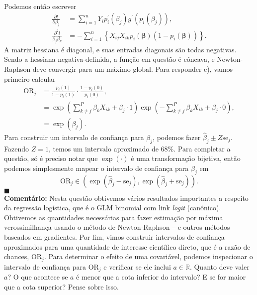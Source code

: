 {\begin{align*}
\end{align*}
Podemos então escrever
\begin{align*}
 \frac{\partial l }{\partial \beta_j} &= \sum_{i=1}^n Y_i  p_i^{\prime}(\beta_j)g^\prime(p_i(\beta_j)),\\
 \frac{\partial^2 l}{\beta_j\beta_k} &= -\sum_{i=1}^n \left\{X_{ij}X_{ik} p_i(\boldsymbol{\beta})\left(1-p_i(\boldsymbol{\beta})\right)\right\}.
\end{align*}
A matriz hessiana é diagonal, e suas entradas diagonais são todas negativas.
Sendo a hessiana negativa-definida, a função em questão é côncava, e Newton-Raphson deve convergir para um máximo global.
Para responder c), vamos primeiro calcular 
\begin{align*}
    \textrm{OR}_j &= \frac{p_i(1)}{1-p_i(1)} \cdot \frac{1-p_i(0)}{p_i(0)},\\
    &= \exp\left(\sum_{k\neq j}^{P} \beta_k X_{ik} + \beta_j \cdot 1\right)\exp\left(-\sum_{k\neq j}^{P} \beta_k X_{ik} + \beta_j \cdot 0\right),\\
    & = \exp\left(\beta_j\right).
\end{align*}
Para construir um intervalo de confiança para $\beta_j$, podemos fazer $\hat{\beta}_j \pm Z \textrm{se}_j$.
Fazendo $Z=1$, temos um intervalo aproximado de 68\%.
Para completar a questão, só é preciso notar que $\exp(\cdot)$ é uma transformação bijetiva, então podemos simplesmente mapear o intervalo de confiança para $\beta_j$ em
\begin{equation}
    \textrm{OR}_j \in \left(\exp\left(\hat{\beta}_j  - \textrm{se}_j \right), \exp\left(\hat{\beta}_j + \textrm{se}_j\right)\right).
\end{equation}
$\blacksquare$\\
\textbf{Comentário:} Nesta questão obtivemos vários resultados importantes a respeito da regressão logística, que é o GLM binomial com link \textit{logit} (canônico).
Obtivemos as quantidades necessárias para fazer estimação por máxima verossimilhança usando o método de Newton-Raphson -- e outros métodos baseados em gradientes. 
Por fim, vimos construir intervalos de confiança aproximados para uma quantidade de interesse científico direto, que é a razão de chances, $ \textrm{OR}_j $.
Para determinar o efeito de uma covariável, podemos inspecionar o intervalo de confiança para $ \textrm{OR}_j $ e verificar se ele inclui $a \in \mathbb{R}$.
Quanto deve valer $a$?
O que acontece se $a$ é menor que a cota inferior do intervalo?
E se for maior que a cota superior?
Pense sobre isso.
}